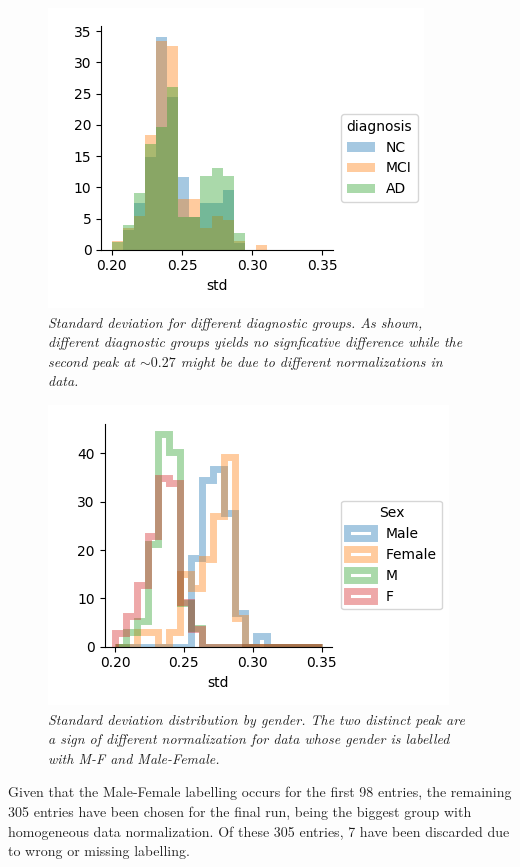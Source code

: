 \documentclass[12pt,openright,twoside,a4paper]{book}
\begin{document}
\begin{figure}[!h]
\centering
\includegraphics[scale=0.75]{std-ADNI}
\caption{\textit{Standard deviation for different diagnostic groups. As shown, different diagnostic groups yields no signficative difference while the second peak at $\sim 0.27$ might be due to different normalizations in data.}}
\label{std-ADNI}
\end{figure}

\begin{figure}[!h]
\centering
\includegraphics[scale=0.75]{ADNi-std-gen}
\caption{\textit{Standard deviation distribution by gender. The two distinct peak are a sign of different normalization for data whose gender is labelled with M-F and Male-Female.}}
\label{std-gen-ADNI}
\end{figure}

Given that the Male-Female labelling occurs for the first 98 entries, the remaining 305 entries have been chosen for the final run, being the biggest group with homogeneous data normalization.
Of these 305 entries, 7 have been discarded due to wrong or missing labelling.
\end{document}
